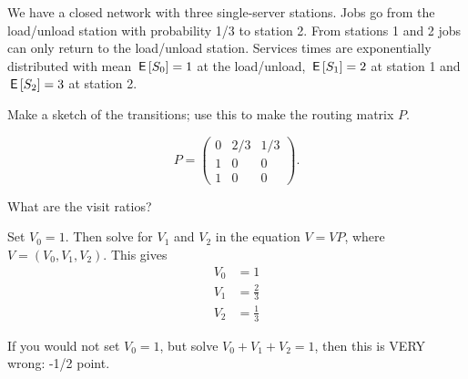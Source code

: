 We have a closed network with three single-server stations. Jobs go from the load/unload station with probability 1/3 to  station 2. From stations 1 and 2 jobs can only return to the load/unload station. Services times are exponentially distributed with mean $\,\mathsf{E}\left[S_0\right] = 1$ at the load/unload, $\,\mathsf{E}\left[S_1\right] = 2$ at station 1 and $\,\mathsf{E}\left[S_2\right]=3$ at station 2.

\begin{exercise}[201807]
Make a sketch of the transitions; use this to make the routing matrix $P$.
\begin{solution}
  \begin{equation*}
  P=
  \begin{pmatrix}
    0 & 2/3 & 1/3 \\
1 & 0 & 0 \\
1 & 0 & 0
  \end{pmatrix}.
  \end{equation*}



\end{solution}
\end{exercise}

\begin{exercise}[201807]
  What are the visit ratios?
\begin{solution}
Set $V_0=1$. Then solve for $V_1$ and $V_2$ in the equation $V = VP$, where $V=(V_0, V_1, V_2)$.
This gives
\begin{align*}
V_0&= 1\\
V_1&= \frac{2}{3}\\
V_2&= \frac{1}{3}
\end{align*}

If you would not set $V_0=1$, but solve $V_0+V_1+V_2 = 1$, then this is VERY wrong: -1/2 point.
\end{solution}
\end{exercise}

